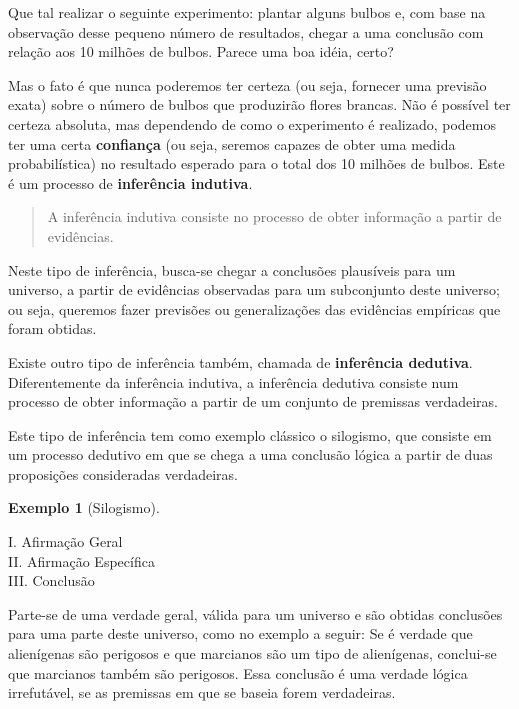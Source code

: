 \documentclass[
]{book}
\theoremstyle{definition}
\theoremstyle{definition}
\newtheorem{example}{Exemplo}[chapter]
\theoremstyle{definition}
\theoremstyle{remark}
\begin{document}
Que tal realizar o seguinte experimento: plantar alguns bulbos e, com base na observação desse pequeno número de resultados, chegar a uma conclusão com relação aos 10 milhões de bulbos.
Parece uma boa idéia, certo?

Mas o fato é que nunca poderemos ter certeza (ou seja, fornecer uma previsão exata) sobre o número de bulbos que produzirão flores brancas. Não é possível ter certeza absoluta, mas dependendo de como o experimento é realizado, podemos ter uma certa \textbf{confiança} (ou seja, seremos capazes de obter uma medida probabilística) no resultado esperado para o total dos 10 milhões de bulbos. Este é um processo de \textbf{inferência indutiva}.

\begin{quote}
A inferência indutiva consiste no processo de obter informação a partir de evidências.
\end{quote}

Neste tipo de inferência, busca-se chegar a conclusões plausíveis para um universo, a partir de evidências observadas para um subconjunto deste universo; ou seja, queremos fazer previsões ou generalizações das evidências empíricas que foram obtidas.

Existe outro tipo de inferência também, chamada de \textbf{inferência dedutiva}. Diferentemente da inferência indutiva, a inferência dedutiva consiste num processo de obter informação a partir de um conjunto de premissas verdadeiras.

Este tipo de inferência tem como exemplo clássico o silogismo, que consiste em um processo dedutivo em que se chega a uma conclusão lógica a partir de duas proposições consideradas verdadeiras.

\begin{example}[Silogismo]
\protect\hypertarget{exm:unnamed-chunk-1}{}{\label{exm:unnamed-chunk-1} {} }
\end{example}

I. Afirmação Geral\\
II. Afirmação Específica\\
III. Conclusão

Parte-se de uma verdade geral, válida para um universo e são obtidas conclusões para uma parte deste universo, como no exemplo a seguir: Se é verdade que alienígenas são perigosos e que marcianos são um tipo de alienígenas, conclui-se que marcianos também são perigosos. Essa conclusão é uma verdade lógica irrefutável, se as premissas em que se baseia forem verdadeiras.
\end{document}
